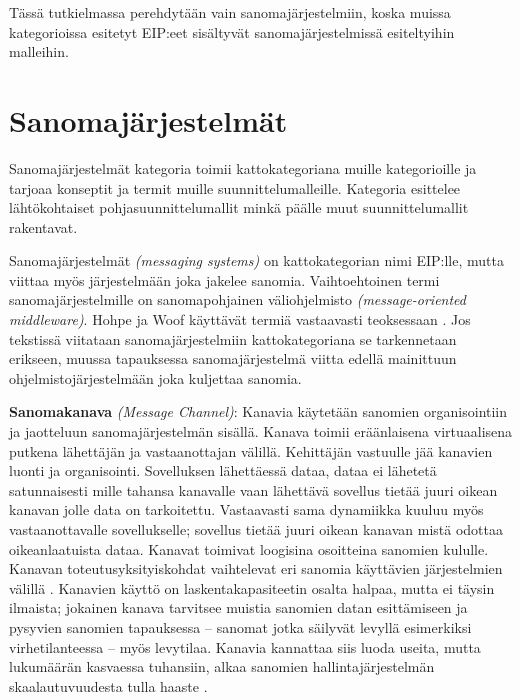 Tässä tutkielmassa perehdytään vain sanomajärjestelmiin, koska muissa kategorioissa esitetyt EIP:eet sisältyvät sanomajärjestelmissä esiteltyihin malleihin.

\section{Sanomajärjestelmät}
Sanomajärjestelmät kategoria toimii kattokategoriana muille kategorioille ja tarjoaa konseptit ja termit muille suunnittelumalleille. 
Kategoria esittelee lähtökohtaiset pohjasuunnittelumallit minkä päälle muut suunnittelumallit rakentavat. 

Sanomajärjestelmät \textit{(messaging systems)} on kattokategorian nimi EIP:lle, mutta viittaa myös järjestelmään joka jakelee sanomia. Vaihtoehtoinen termi sanomajärjestelmille on sanomapohjainen väliohjelmisto \textit{(message-oriented middleware)}. Hohpe ja Woof käyttävät termiä vastaavasti teoksessaan \citep{Hohpe2004}. Jos tekstissä viitataan sanomajärjestelmiin kattokategoriana se tarkennetaan erikseen, muussa tapauksessa sanomajärjestelmä viitta edellä mainittuun ohjelmistojärjestelmään joka kuljettaa sanomia.

\textbf{Sanomakanava} \textit{(Message Channel)}:
      Kanavia käytetään sanomien organisointiin ja jaotteluun sanomajärjestelmän sisällä. Kanava toimii eräänlaisena virtuaalisena putkena lähettäjän ja vastaanottajan välillä. Kehittäjän vastuulle jää kanavien luonti ja organisointi. Sovelluksen lähettäessä dataa, dataa ei lähetetä satunnaisesti mille tahansa kanavalle vaan lähettävä sovellus tietää juuri oikean kanavan jolle data on tarkoitettu. Vastaavasti sama dynamiikka kuuluu myös vastaanottavalle sovellukselle; sovellus tietää juuri oikean kanavan mistä odottaa oikeanlaatuista dataa.
      Kanavat toimivat loogisina osoitteina sanomien kululle. Kanavan toteutusyksityiskohdat vaihtelevat eri sanomia käyttävien järjestelmien välillä \citep{EnterpriseIntegration} \citep{Hohpe2004}.
      Kanavien käyttö on laskentakapasiteetin osalta halpaa, mutta ei täysin ilmaista; jokainen kanava tarvitsee muistia sanomien datan esittämiseen ja pysyvien sanomien tapauksessa -- sanomat jotka säilyvät levyllä esimerkiksi virhetilanteessa -- myös levytilaa. Kanavia kannattaa siis luoda useita, mutta lukumäärän kasvaessa tuhansiin, alkaa sanomien hallintajärjestelmän skaalautuvuudesta tulla haaste \citep{Hohpe2004}.

